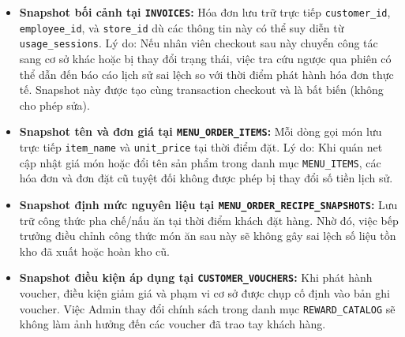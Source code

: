 \begin{itemize}
  \item \textbf{Snapshot bối cảnh tại \texttt{INVOICES}:} Hóa đơn lưu trữ trực tiếp \texttt{customer\_id}, \texttt{employee\_id}, và \texttt{store\_id} dù các thông tin này có thể suy diễn từ \texttt{usage\_sessions}. Lý do: Nếu nhân viên checkout sau này chuyển công tác sang cơ sở khác hoặc bị thay đổi trạng thái, việc tra cứu ngược qua phiên có thể dẫn đến báo cáo lịch sử sai lệch so với thời điểm phát hành hóa đơn thực tế. Snapshot này được tạo cùng transaction checkout và là bất biến (không cho phép sửa).\par
  \item \textbf{Snapshot tên và đơn giá tại \texttt{MENU\_ORDER\_ITEMS}:} Mỗi dòng gọi món lưu trực tiếp \texttt{item\_name} và \texttt{unit\_price} tại thời điểm đặt. Lý do: Khi quán net cập nhật giá món hoặc đổi tên sản phẩm trong danh mục \texttt{MENU\_ITEMS}, các hóa đơn và đơn đặt cũ tuyệt đối không được phép bị thay đổi số tiền lịch sử.\par
  \item \textbf{Snapshot định mức nguyên liệu tại \texttt{MENU\_ORDER\_RECIPE\_SNAPSHOTS}:} Lưu trữ công thức pha chế/nấu ăn tại thời điểm khách đặt hàng. Nhờ đó, việc bếp trưởng điều chỉnh công thức món ăn sau này sẽ không gây sai lệch số liệu tồn kho đã xuất hoặc hoàn kho cũ.\par
  \item \textbf{Snapshot điều kiện áp dụng tại \texttt{CUSTOMER\_VOUCHERS}:} Khi phát hành voucher, điều kiện giảm giá và phạm vi cơ sở được chụp cố định vào bản ghi voucher. Việc Admin thay đổi chính sách trong danh mục \texttt{REWARD\_CATALOG} sẽ không làm ảnh hưởng đến các voucher đã trao tay khách hàng.\par
\end{itemize}

